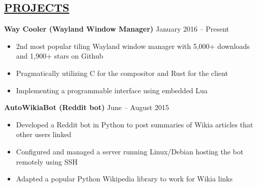 \documentclass[overlapped,line]{res}
\begin{document}
\begin{resume}
\section{\underline{PROJECTS}}
\textbf{Way Cooler (Wayland Window Manager)} \hfill January 2016 \--- Present
\begin{itemize}  \itemsep -2pt
	\item 2nd most popular tiling Wayland window manager with 5,000+ downloads and 1,900+ stars on Github
	\item Pragmatically utilizing C for the compositor and Rust for the client
	\item Implementing a programmable interface using embedded Lua
\end{itemize}

\textbf{AutoWikiaBot (Reddit bot)} \hfill            June \--- August 2015
\begin{itemize}  \itemsep -2pt
	\item Developed a Reddit bot in Python to post summaries of Wikia articles that other users linked
	\item Configured and managed a server running Linux/Debian hosting the bot remotely using SSH
	\item Adapted a popular Python Wikipedia library to work for Wikia links
\end{itemize}

\end{resume}
\end{document}
